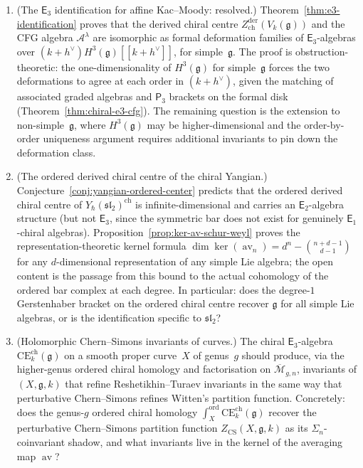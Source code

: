\documentclass[11pt,reqno]{amsart}
\theoremstyle{definition}
\theoremstyle{remark}
\newcommand{\cA}{\mathcal{A}}
\newcommand{\cM}{\mathcal{M}}
\newcommand{\CE}{\mathrm{CE}}
\newcommand{\Eone}{\mathsf{E}_{1}}
\newcommand{\Etwo}{\mathsf{E}_{2}}
\newcommand{\Ethree}{\mathsf{E}_{3}}
\newcommand{\Pthree}{\mathsf{P}_{3}}
\DeclareMathOperator{\av}{av}
\newcommand{\fg}{\mathfrak{g}}
\numberwithin{equation}{section}
\begin{document}
\begin{enumerate}[label=\textup{(\alph*)}]

\item \textup{(The $\Ethree$ identification
for affine Kac--Moody: resolved.)}
Theorem~\ref{thm:e3-identification} proves that the
derived chiral centre
$Z^{\mathrm{der}}_{\mathrm{ch}}(V_k(\fg))$ and the
CFG algebra $\cA^\lambda$ are isomorphic as formal
deformation families of $\Ethree$-algebras over
$(k+h^\vee) H^3(\fg)[[k+h^\vee]]$, for simple~$\fg$.
The proof is obstruction-theoretic: the
one-dimensionality of $H^3(\fg)$ for simple~$\fg$
forces the two deformations to agree at each order in
$(k+h^\vee)$, given the matching of associated graded
algebras and $\Pthree$ brackets on the formal disk
(Theorem~\ref{thm:chiral-e3-cfg}).
The remaining question is the extension to
non-simple~$\fg$, where $H^3(\fg)$ may be
higher-dimensional and the order-by-order uniqueness
argument requires additional invariants to pin down the
deformation class.

\item \textup{(The ordered derived chiral centre of the
chiral Yangian.)}
Conjecture~\ref{conj:yangian-ordered-center} predicts
that the ordered derived chiral centre of
$Y_\hbar(\mathfrak{sl}_2)^{\mathrm{ch}}$ is
infinite-dimensional and carries an $\Etwo$-algebra
structure (but not $\Ethree$, since the symmetric bar does
not exist for genuinely $\Eone$-chiral algebras).
Proposition~\ref{prop:ker-av-schur-weyl} proves the
representation-theoretic kernel formula
$\dim\ker(\av_n) = d^n - \binom{n+d-1}{d-1}$ for any
$d$-dimensional representation of any simple Lie algebra;
the open content is the passage from
this bound to the actual cohomology of the ordered bar
complex at each degree. In particular: does the degree-$1$
Gerstenhaber bracket on the ordered chiral centre
recover $\fg$ for all simple Lie algebras, or is the
identification specific to $\mathfrak{sl}_2$?

\item \textup{(Holomorphic Chern--Simons invariants of
curves.)}
The chiral $\Ethree$-algebra
$\CE^{\mathrm{ch}}_k(\fg)$ on a smooth proper
curve~$X$ of genus~$g$ should produce, via the
higher-genus ordered chiral homology and factorisation on
$\overline{\cM}_{g,n}$, invariants of $(X, \fg, k)$
that refine Reshetikhin--Turaev invariants in the same
way that perturbative Chern--Simons refines Witten's
partition function.
Concretely: does the genus-$g$ ordered chiral homology
$\int_X^{\mathrm{ord}} \CE^{\mathrm{ch}}_k(\fg)$
recover the perturbative Chern--Simons partition function
$Z_{\mathrm{CS}}(X, \fg, k)$ as its $\Sigma_n$-coinvariant
shadow, and what invariants live in the kernel of
the averaging map $\av$?


\end{enumerate}
\end{document}
